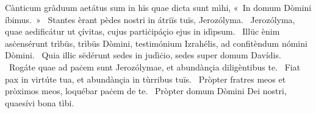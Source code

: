 { Cànticum gràduum}
{%
aetátus sum in hïs quae dicta sunt mìhi, «~In domum Dòmini íbimus.~»
~Stantes èrant pèdes nostri in átriïs tuïs, Jerozólyma. 
~Jerozólyma, quae aedificátur ut çívitas, cujus partiċipáçio ejus in idìpsum. 
~Illüc ènim asċensérunt trìbüs, trìbüs Dòmini, testimónium Izrahélis, ad confitèndum nómini Dòmini. 
~Quia illic sëdérunt sedes in judìċio, sedes super domum Davídis. 
~Rogáte quae ad paċem sunt Jerozólymae, et abundànçia diligèntibus te. 
~Fiat pax in virtúte tua, et abundànçia in tùrribus tuïs. 
~Pròpter fratres meos et pròximos meos, loquébar paċem de te. 
~Pròpter domum Dòmini Dei nostri, quaesívi bona tìbi. 
}
